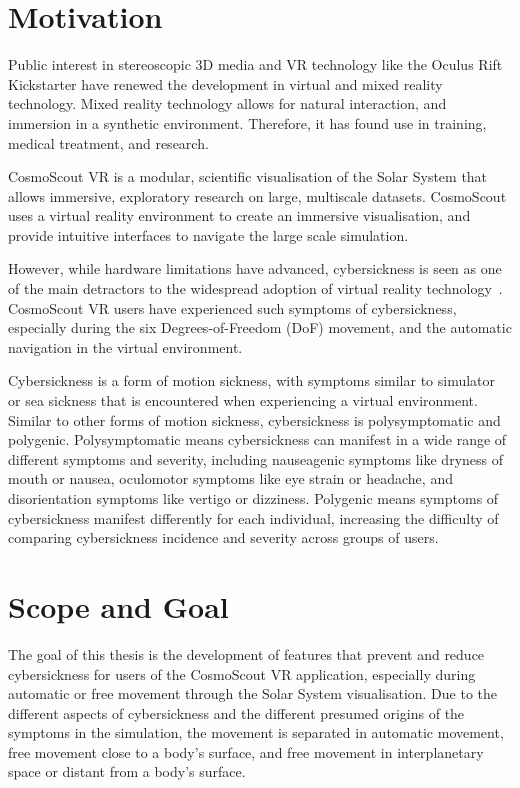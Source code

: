 \section{Motivation}\label{sec:motivation}

Public interest in stereoscopic 3D media and VR technology like the Oculus Rift Kickstarter have renewed the
development in virtual and mixed reality technology.
Mixed reality technology allows for natural interaction, and immersion in a synthetic environment.
Therefore, it has found use in training, medical treatment, and research.

CosmoScout VR is a modular, scientific visualisation of the Solar System that allows immersive, exploratory research
on large, multiscale datasets.
CosmoScout uses a virtual reality environment to create an immersive visualisation, and provide intuitive interfaces to
navigate the large scale simulation.

However, while hardware limitations have advanced, cybersickness is seen as one of the main detractors to the
widespread adoption of virtual reality technology~\cite{Rebenitsch2016}.
CosmoScout VR users have experienced such symptoms of cybersickness, especially during the six Degrees-of-Freedom (DoF)
movement, and the automatic navigation in the virtual environment.

Cybersickness is a form of motion sickness, with symptoms similar to simulator or sea sickness that is encountered
when experiencing a virtual environment.
Similar to other forms of motion sickness, cybersickness is polysymptomatic and polygenic.
Polysymptomatic means cybersickness can manifest in a wide range of different symptoms and severity, including
nauseagenic symptoms like dryness of mouth or nausea, oculomotor symptoms like eye strain or headache, and
disorientation symptoms like vertigo or dizziness.
Polygenic means symptoms of cybersickness manifest differently for each individual, increasing the difficulty of
comparing cybersickness incidence and severity across groups of users.


\section{Scope and Goal}\label{sec:scope-and-goal}

The goal of this thesis is the development of features that prevent and reduce cybersickness for users of the
CosmoScout VR application, especially during automatic or free movement through the Solar System visualisation.
Due to the different aspects of cybersickness and the different presumed origins of the symptoms in the simulation,
the movement is separated in automatic movement, free movement close to a body's surface, and free movement in
interplanetary space or distant from a body's surface.

